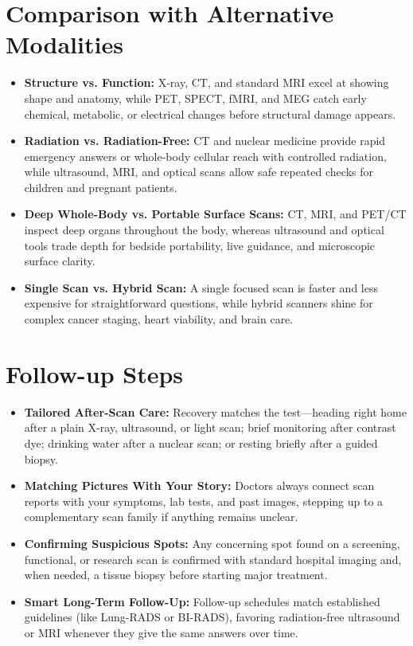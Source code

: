 \section{Comparison with Alternative Modalities}
\begin{itemize}
  \item \textbf{Structure vs. Function:} X-ray, CT, and standard MRI excel at showing shape and anatomy, while PET, SPECT, fMRI, and MEG catch early chemical, metabolic, or electrical changes before structural damage appears.
  \item \textbf{Radiation vs. Radiation-Free:} CT and nuclear medicine provide rapid emergency answers or whole-body cellular reach with controlled radiation, while ultrasound, MRI, and optical scans allow safe repeated checks for children and pregnant patients.
  \item \textbf{Deep Whole-Body vs. Portable Surface Scans:} CT, MRI, and PET/CT inspect deep organs throughout the body, whereas ultrasound and optical tools trade depth for bedside portability, live guidance, and microscopic surface clarity.
  \item \textbf{Single Scan vs. Hybrid Scan:} A single focused scan is faster and less expensive for straightforward questions, while hybrid scanners shine for complex cancer staging, heart viability, and brain care.
\end{itemize}

\section{Follow-up Steps}
\begin{itemize}
  \item \textbf{Tailored After-Scan Care:} Recovery matches the test---heading right home after a plain X-ray, ultrasound, or light scan; brief monitoring after contrast dye; drinking water after a nuclear scan; or resting briefly after a guided biopsy.
  \item \textbf{Matching Pictures With Your Story:} Doctors always connect scan reports with your symptoms, lab tests, and past images, stepping up to a complementary scan family if anything remains unclear.
  \item \textbf{Confirming Suspicious Spots:} Any concerning spot found on a screening, functional, or research scan is confirmed with standard hospital imaging and, when needed, a tissue biopsy before starting major treatment.
  \item \textbf{Smart Long-Term Follow-Up:} Follow-up schedules match established guidelines (like Lung-RADS or BI-RADS), favoring radiation-free ultrasound or MRI whenever they give the same answers over time.
\end{itemize}

